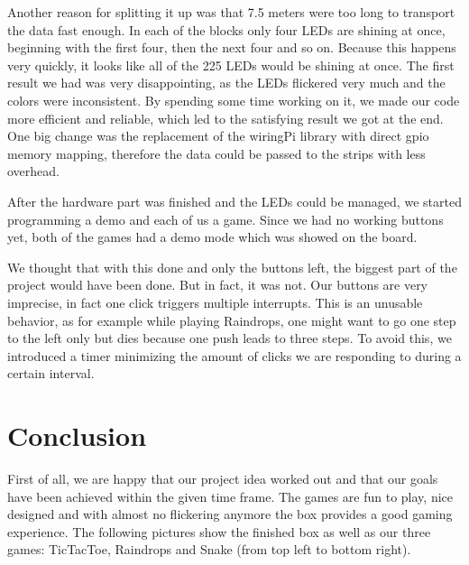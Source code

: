 \documentclass[a4paper,12pt]{article}
\begin{document}
 Another reason for splitting it up was that 7.5 meters were too long to transport the data fast enough.
 In each of the blocks only four LEDs are shining at once, beginning with the first four, then the next four and so on.
 Because this happens very quickly, it looks like all of the 225 LEDs would be shining at once.
 The first result we had was very disappointing, as the LEDs flickered very much and the colors were inconsistent.
 By spending some time working on it, we made our code more efficient and reliable, which led to the satisfying result we got at the end.
 One big change was the replacement of the wiringPi library with direct gpio memory mapping, therefore the data could be passed to the strips with less overhead.

After the hardware part was finished and the LEDs could be managed, we started programming a demo and each of us a game.
 Since we had no working buttons yet, both of the games had a demo mode which was showed on the board.

We thought that with this done and only the buttons left, the biggest part of the project would have been done.
 But in fact, it was not.
 Our buttons are very imprecise, in fact one click triggers multiple interrupts.
 This is an unusable behavior, as for example while playing Raindrops, one might want to go one step to the left only but dies because one push leads to three steps.
 To avoid this, we introduced a timer minimizing the amount of clicks we are responding to during a certain interval.

\section{Conclusion}
First of all, we are happy that our project idea worked out and that our goals have been achieved within the given time frame.
 The games are fun to play, nice designed and with almost no flickering anymore the box provides a good gaming experience.
 The following pictures show the finished box as well as our three games: TicTacToe, Raindrops and Snake (from top left to bottom right).
 
\end{document}
